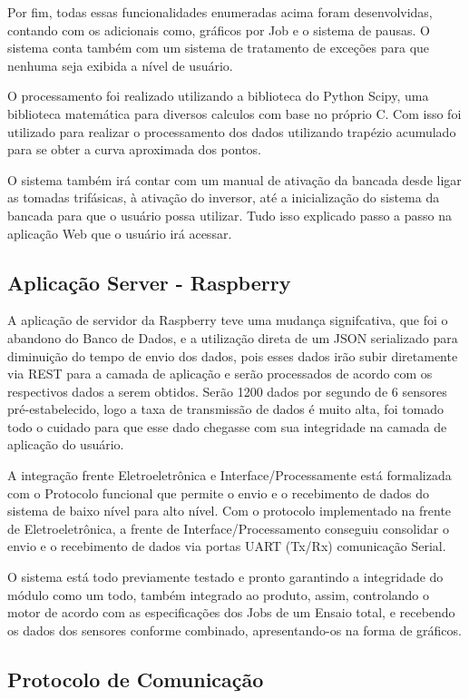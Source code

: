 Por fim, todas essas funcionalidades enumeradas acima foram desenvolvidas, contando com os adicionais como, gráficos por Job e o sistema de pausas. O sistema conta também com um sistema de tratamento de exceções para que nenhuma seja exibida a nível de usuário.

O processamento foi realizado utilizando a biblioteca do Python Scipy, uma biblioteca matemática para diversos calculos com base no próprio C. Com isso foi utilizado para realizar o processamento dos dados utilizando trapézio acumulado para se obter a curva aproximada dos pontos.

O sistema também irá contar com um manual de ativação da bancada desde ligar as tomadas trifásicas, à ativação do inversor, até a inicialização do sistema da bancada para que o usuário possa utilizar. Tudo isso explicado passo a passo na aplicação Web que o usuário irá acessar.

\subsection{Aplicação Server - Raspberry}

A aplicação de servidor da Raspberry teve uma mudança signifcativa, que foi o abandono do Banco de Dados, e a utilização direta de um JSON serializado para diminuição do tempo de envio dos dados, pois esses dados irão subir diretamente via REST para a camada de aplicação e serão processados de acordo com os respectivos dados a serem obtidos. Serão 1200 dados por segundo de 6 sensores pré-estabelecido, logo a taxa de transmissão de dados é muito alta, foi tomado todo o cuidado para que esse dado chegasse com sua integridade na camada de aplicação do usuário.

A integração frente Eletroeletrônica e Interface/Processamente está formalizada com o Protocolo funcional que permite o envio e o recebimento de dados do sistema de baixo nível para alto nível. Com o protocolo implementado na frente de Eletroeletrônica, a frente de Interface/Processamento conseguiu consolidar o envio e o recebimento de dados via portas UART (Tx/Rx) comunicação Serial.

O sistema está todo previamente testado e pronto garantindo a integridade do módulo como um todo, também integrado ao produto, assim, controlando o motor de acordo com as especificações dos Jobs de um Ensaio total, e recebendo os dados dos sensores conforme combinado, apresentando-os na forma de gráficos.

\subsection{Protocolo de Comunicação}

